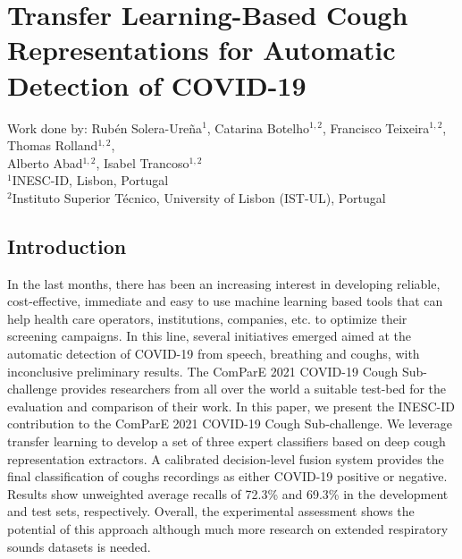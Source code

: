 \chapter{Transfer Learning-Based Cough Representations for Automatic Detection of COVID-19}
\label{chapter:appendixA}
Work done by: Rubén Solera-Ureña$^1$, Catarina Botelho$^{1,2}$, Francisco Teixeira$^{1,2}$, Thomas Rolland$^{1,2}$, \\Alberto Abad$^{1,2}$, Isabel Trancoso$^{1,2}$\\
 $^1$INESC-ID, Lisbon, Portugal\\
  $^2$Instituto Superior Técnico, University of Lisbon (IST-UL), Portugal

\section{Introduction}
In the last months, there has been an increasing interest in developing reliable, cost-effective, immediate and easy to use machine learning based tools that can help health care operators, institutions, companies, etc. to optimize their screening campaigns. In this line, several initiatives emerged aimed at the automatic detection of COVID-19 from speech, breathing and coughs, with inconclusive preliminary results. The ComParE 2021 COVID-19 Cough Sub-challenge provides researchers from all over the world a suitable test-bed for the evaluation and comparison of their work. In this paper, we present the INESC-ID contribution to the ComParE 2021 COVID-19 Cough Sub-challenge. We leverage transfer learning to develop a set of three expert classifiers based on deep cough representation extractors. 
A calibrated decision-level fusion system provides the final classification of coughs recordings as either COVID-19 positive or negative. Results show unweighted average recalls of 72.3\% and 69.3\% in the development and test sets, respectively. Overall, the experimental assessment shows the potential of this approach although much more research on extended respiratory sounds datasets is needed.
